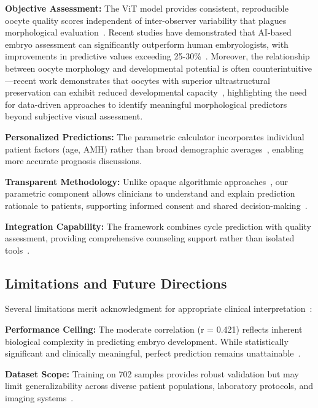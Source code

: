 \textbf{Objective Assessment:} The ViT model provides consistent, reproducible oocyte quality scores independent of inter-observer variability that plagues morphological evaluation~\cite{paternot2009observer,paternot2011multicentre}. Recent studies have demonstrated that AI-based embryo assessment can significantly outperform human embryologists, with improvements in predictive values exceeding 25-30\%~\cite{silver2020datadriven}. Moreover, the relationship between oocyte morphology and developmental potential is often counterintuitive—recent work demonstrates that oocytes with superior ultrastructural preservation can exhibit reduced developmental capacity~\cite{reader2022high}, highlighting the need for data-driven approaches to identify meaningful morphological predictors beyond subjective visual assessment.

\textbf{Personalized Predictions:} The parametric calculator incorporates individual patient factors (age, AMH) rather than broad demographic averages~\cite{gameiro2023understanding}, enabling more accurate prognosis discussions.

\textbf{Transparent Methodology:} Unlike opaque algorithmic approaches~\cite{rudin2019stop}, our parametric component allows clinicians to understand and explain prediction rationale to patients, supporting informed consent and shared decision-making~\cite{beauchamp2019principles}.

\textbf{Integration Capability:} The framework combines cycle prediction with quality assessment, providing comprehensive counseling support rather than isolated tools~\cite{asrm2021counselors}.

\subsection{Limitations and Future Directions}

Several limitations merit acknowledgment for appropriate clinical interpretation~\cite{varoquaux2022machine}:

\textbf{Performance Ceiling:} The moderate correlation (r = 0.421) reflects inherent biological complexity in predicting embryo development. While statistically significant and clinically meaningful, perfect prediction remains unattainable~\cite{rajkomar2019machine}.

\textbf{Dataset Scope:} Training on 702 samples provides robust validation but may limit generalizability across diverse patient populations, laboratory protocols, and imaging systems~\cite{litjens2017survey}.

